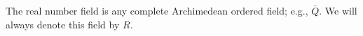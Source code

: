 The real number field is any complete Archimedean ordered field; e.g., $\bar{Q}$. We will always denote this field by $R$.